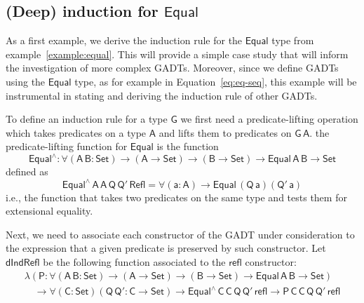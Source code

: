 \documentclass[9pt]{entcs} \usepackage{entcsmacro}
\begin{document}
\subsection{(Deep) induction for $\mathsf{Equal}$}\label{sec:ind-equal}


As a first example, we derive the induction rule for the $\mathsf{Equal}$ type from example~\ref{example:equal}.
This will provide a simple case study that will inform the investigation of more complex GADTs.
Moreover, since we define GADTs using the $\mathsf{Equal}$ type,
as for example in Equation~\ref{eq:eq-seq},
this example will be instrumental in stating and deriving the induction rule of other GADTs.

To define an induction rule for a type $\mathsf{G}$ we first need a predicate-lifting operation
which takes predicates on a type $\mathsf{A}$ and lifts them to predicates on $\mathsf{G\,A}$.
the predicate-lifting function for $\mathsf{Equal}$ is the function
\[
\mathsf{Equal^{\wedge} : \forall (A\,B : Set) \to (A \to Set) \to (B \to Set) \to Equal\,A\,B \to Set}
\]
defined as
\[
\mathsf{Equal^{\wedge}\,A\,A\,Q\,Q'\,Refl = \forall (a : A) \to Equal\,(Q\,a)(Q'\,a)}
\]
i.e., the function that takes two predicates on the same type and tests them for extensional equality.

Next, we need to associate each constructor of the GADT under consideration
to the expression that a given predicate is preserved by such constructor.
Let $\mathsf{dIndRefl}$ be the following function associated to the $\mathsf{refl}$ constructor:
\[
\begin{array}{l}
\mathsf{\lambda (P : \forall (A\,B : Set) \to (A \to Set) \to (B \to Set) \to Equal\,A\,B \to Set)} \\
\quad\mathsf{\to \forall (C : Set) (Q\, Q' : C \to Set) \to Equal^{\wedge}\,C\,C\,Q\,Q'\,refl \to P\,C\,C\,Q\,Q'\,refl}
\end{array}
\]
\end{document}

